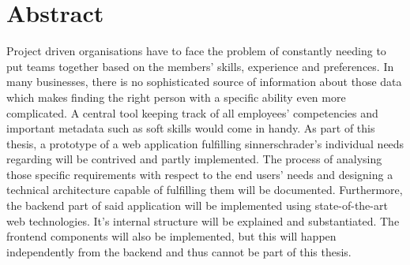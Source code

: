 \chapter{Abstract}
Project driven organisations have to face the problem of constantly needing to put teams together based on the members’ skills, experience and preferences. In many businesses, there is no sophisticated source of information about those data which makes finding the right person with a specific ability even more complicated.
A central tool keeping track of all employees’ competencies and important metadata such as soft skills would come in handy.
As part of this thesis, a prototype of a web application fulfilling sinnerschrader’s individual needs regarding will be contrived and partly implemented. The process of analysing those specific requirements with respect to the end users’ needs and designing a technical architecture capable of fulfilling them will be documented. Furthermore, the backend part of said application will be implemented using state-of-the-art web technologies. It’s internal structure will be explained and substantiated. The frontend components will also be implemented, but this will happen independently from the backend and thus cannot be part of this thesis.

